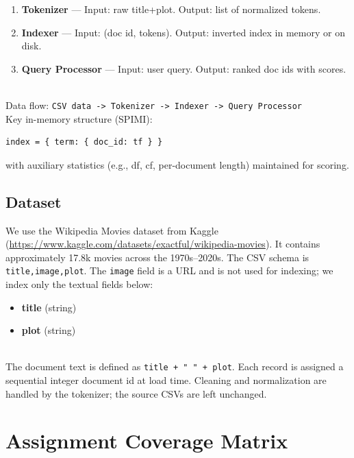 \documentclass[11pt,a4paper]{article}
\begin{document}
\begin{enumerate}
    \item \textbf{Tokenizer} — Input: raw title+plot. Output: list of normalized tokens.
    \item \textbf{Indexer} — Input: (doc id, tokens). Output: inverted index in memory or on disk.
    \item \textbf{Query Processor} — Input: user query. Output: ranked doc ids with scores.
\end{enumerate}
\\
Data flow:
\noindent\texttt{CSV data -> Tokenizer -> Indexer -> Query Processor}
\\
Key in-memory structure (SPIMI):
\begin{verbatim}
index = { term: { doc_id: tf } }
\end{verbatim}
with auxiliary statistics (e.g., df, cf, per-document length) maintained for scoring.

\newpage
\subsection{Dataset}

We use the Wikipedia Movies dataset from Kaggle (\url{https://www.kaggle.com/datasets/exactful/wikipedia-movies}). It contains approximately 17.8k movies across the 1970s–2020s. The CSV schema is \texttt{title,image,plot}. The \texttt{image} field is a URL and is not used for indexing; we index only the textual fields below:
\begin{itemize}
    \item \textbf{title} (string)
    \item \textbf{plot} (string)
\end{itemize}
\\
The document text is defined as \texttt{title + " " + plot}. Each record is assigned a sequential integer document id at load time. Cleaning and normalization are handled by the tokenizer; the source CSVs are left unchanged.

\section*{Assignment Coverage Matrix}
\end{document}

